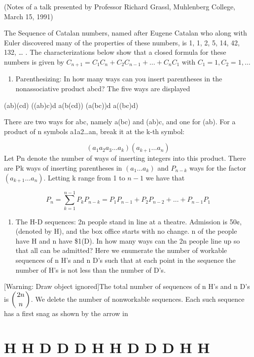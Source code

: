 \documentclass{article}
\begin{document}
 (Notes of a talk presented by Professor Richard Grassl, Muhlenberg College, March 15, 1991)

The Sequence of Catalan numbers, named after Eugene Catalan who along with Euler discovered many of the properties of
these numbers, is 1, 1, 2, 5, 14, 42, 132, … . The characterizations below show that a closed formula for these numbers
is given by  $C_{n+1}=C_1C_n+C_2C_{n-1}+{\dots}+C_nC_1$  with  $C_1=1,C_2=1,{\dots}$

\begin{enumerate}
\item Parenthesizing: In how many ways can you insert parentheses in the nonassociative product abcd? The five ways are
displayed
\end{enumerate}
(ab)(cd)  ((ab)c)d  a(b(cd))  (a(bc))d  a((bc)d)

There are two ways for abc, namely a(bc) and (ab)c, and one for (ab). For a product of n symbols a1a2…an, break it at
the k-th symbol:

\begin{equation*}
\left(a_1a_2a_3{\dots}a_k\right)(a_{k+1}{\dots}a_n)
\end{equation*}
Let Pn denote the number of ways of inserting integers into this product. There are Pk ways of inserting parentheses in 
$\left(a_1{\dots}a_k\right)$ and  $P_{n-k}$ ways for the factor  $(a_{k+1}{\dots}a_n)$. Letting k range from 1 to 
$n-1$  we have that

\begin{equation*}
P_n=\sum _{k=1}^{n-1}P_kP_{n-k}=P_1P_{n-1}+P_2P_{n-2}+{\dots}+P_{n-1}P_1
\end{equation*}
\begin{enumerate}
\item The H-D sequences: 2n people stand in line at a theatre. Admission is 50¢, (denoted by H), and the box office
starts with no change. n of the people have H and n have \$1(D). In how many ways can the 2n people line up so that all
can be admitted? Here we enumerate the number of workable sequences of n H’s and n D’s such that at each point in the
sequence the number of H’s is not less than the number of D’s.
\end{enumerate}
[Warning: Draw object ignored]The total number of sequences of n H’s and n D’s is 
$\left(\genfrac{}{}{0pt}{0}{2n}n\right)$. We delete the number of nonworkable sequences. Each such sequence has a first
snag as shown by the arrow in 

\section[H H D D D H H D D D H H]{H H D D D H H D D D H H}
\end{document}
